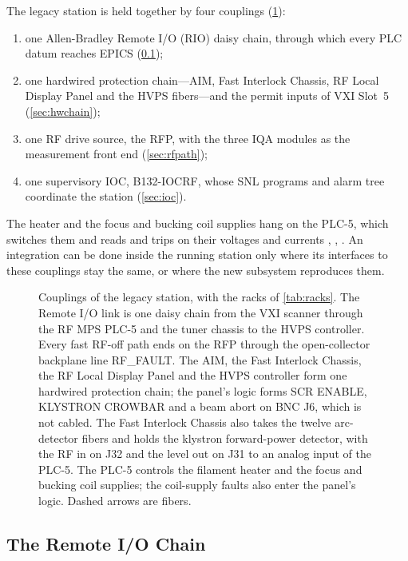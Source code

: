 The legacy station is held together by four couplings (\cref{fig:legacy-couplings}):
\begin{enumerate}
\item one Allen-Bradley Remote I/O (RIO) daisy chain, through which every PLC datum
reaches EPICS (\cref{sec:rio});
\item one hardwired protection chain---AIM, Fast Interlock Chassis, RF Local Display
Panel and the HVPS fibers---and the permit inputs of VXI Slot~5 (\cref{sec:hwchain});
\item one RF drive source, the RFP, with the three IQA modules as the measurement
front end (\cref{sec:rfpath});
\item one supervisory IOC, \mbox{B132-IOCRF}, whose SNL programs and alarm tree
coordinate the station (\cref{sec:ioc}).
\end{enumerate}
The heater and the focus and bucking coil supplies hang on the PLC-5, which switches
them and reads and trips on their voltages and currents , , . An integration
can be done inside the running station only where its interfaces to these couplings
stay the same, or where the new subsystem reproduces them.
\suppressfloats[t]

\begin{figure}[tbp]
\centering
\begin{fitpicture}

\end{fitpicture}
\caption[Couplings of the legacy station.]{Couplings of the legacy station, with the
racks of \cref{tab:racks}. The Remote I/O link is one daisy chain from the VXI scanner
through the RF MPS PLC-5 and the tuner chassis to the HVPS controller. Every fast
RF-off path ends on the RFP through the open-collector backplane line RF\_FAULT. The
AIM, the Fast Interlock Chassis, the RF Local Display Panel and the HVPS controller
form one hardwired protection chain; the panel's logic forms SCR ENABLE, KLYSTRON
CROWBAR and a beam abort on BNC J6, which is not cabled. The Fast Interlock Chassis also
takes the twelve arc-detector fibers and holds the klystron forward-power detector,
with the RF in on J32 and the level out on J31 to an analog input of the PLC-5. The
PLC-5 controls the filament heater
and the focus and bucking coil supplies; the coil-supply faults also enter the panel's
logic. Dashed arrows are fibers.}\label{fig:legacy-couplings}
\end{figure}

\subsection{The Remote I/O Chain}\label{sec:rio}

